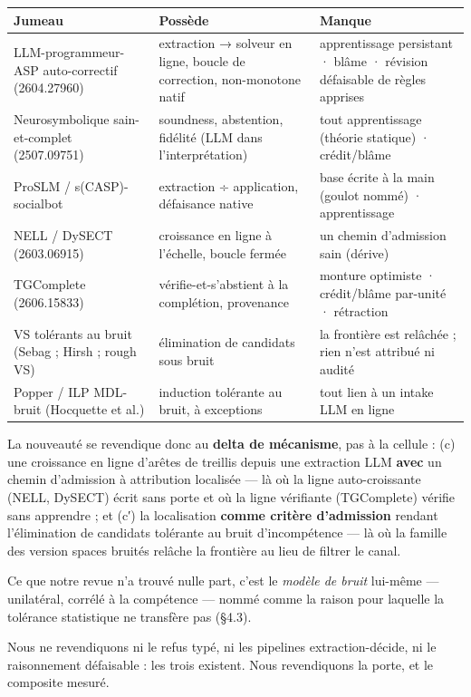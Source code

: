 \documentclass[11pt]{article}
\begin{document}
\begin{center}\small\begin{tabular}{lll}\toprule
Jumeau & Possède & Manque \\ \midrule
LLM-programmeur-ASP auto-correctif (2604.27960) & extraction → solveur en ligne, boucle de correction, non-monotone natif & apprentissage persistant · blâme · révision défaisable de règles apprises \\
Neurosymbolique sain-et-complet (2507.09751) & soundness, abstention, fidélité (LLM dans l'interprétation) & tout apprentissage (théorie statique) · crédit/blâme \\
ProSLM / s(CASP)-socialbot & extraction ÷ application, défaisance native & base écrite à la main (goulot nommé) · apprentissage \\
NELL / DySECT (2603.06915) & croissance en ligne à l'échelle, boucle fermée & un chemin d'admission sain (dérive) \\
TGComplete (2606.15833) & vérifie-et-s'abstient à la complétion, provenance & monture optimiste · crédit/blâme par-unité · rétraction \\
VS tolérants au bruit (Sebag ; Hirsh ; rough VS) & élimination de candidats sous bruit & la frontière est relâchée ; rien n'est attribué ni audité \\
Popper / ILP MDL-bruit (Hocquette et al.) & induction tolérante au bruit, à exceptions & tout lien à un intake LLM en ligne \\
\bottomrule\end{tabular}\end{center}

La nouveauté se revendique donc au \textbf{delta de mécanisme}, pas à la cellule : (c) une croissance en ligne d'arêtes de treillis depuis une extraction LLM \textbf{avec} un chemin d'admission à attribution localisée — là où la ligne auto-croissante (NELL, DySECT) écrit sans porte et où la ligne vérifiante (TGComplete) vérifie sans apprendre ; et (c′) la localisation \textbf{comme critère d'admission} rendant l'élimination de candidats tolérante au bruit d'incompétence — là où la famille des version spaces bruités relâche la frontière au lieu de filtrer le canal.

Ce que notre revue n'a trouvé nulle part, c'est le \emph{modèle de bruit} lui-même — unilatéral, corrélé à la compétence — nommé comme la raison pour laquelle la tolérance statistique ne transfère pas (§4.3).

Nous ne revendiquons ni le refus typé, ni les pipelines extraction-décide, ni le raisonnement défaisable : les trois existent. Nous revendiquons la porte, et le composite mesuré.
\end{document}
